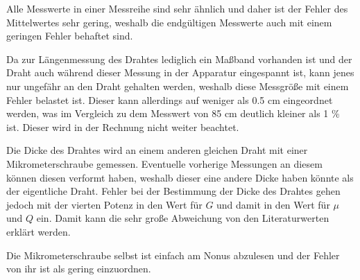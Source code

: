 Alle Messwerte in einer Messreihe sind sehr ähnlich und daher ist der Fehler des Mittelwertes sehr gering, weshalb die endgültigen Messwerte auch mit einem geringen Fehler behaftet sind.

Da zur Längenmessung des Drahtes lediglich ein Maßband vorhanden ist und der Draht auch während dieser Messung in der Apparatur eingespannt ist, kann jenes nur ungefähr an den Draht gehalten werden, weshalb diese Messgröße mit einem Fehler belastet ist.
Dieser kann allerdings auf weniger als 0.5 cm eingeordnet werden, was im Vergleich zu dem Messwert von 85 cm deutlich kleiner als 1 \% ist. Dieser wird in der Rechnung nicht weiter beachtet.

Die Dicke des Drahtes wird an einem anderen gleichen Draht mit einer Mikrometerschraube gemessen. 
Eventuelle vorherige Messungen an diesem können diesen verformt haben, weshalb dieser eine andere Dicke haben könnte als der eigentliche Draht.
Fehler bei der Bestimmung der Dicke des Drahtes gehen jedoch mit der vierten Potenz in den Wert für $G$ und damit in den Wert für $\mu$ und $Q$ ein.
Damit kann die sehr große Abweichung von den Literaturwerten erklärt werden.

Die Mikrometerschraube selbst ist einfach am Nonus abzulesen und der Fehler von ihr ist als gering einzuordnen.
